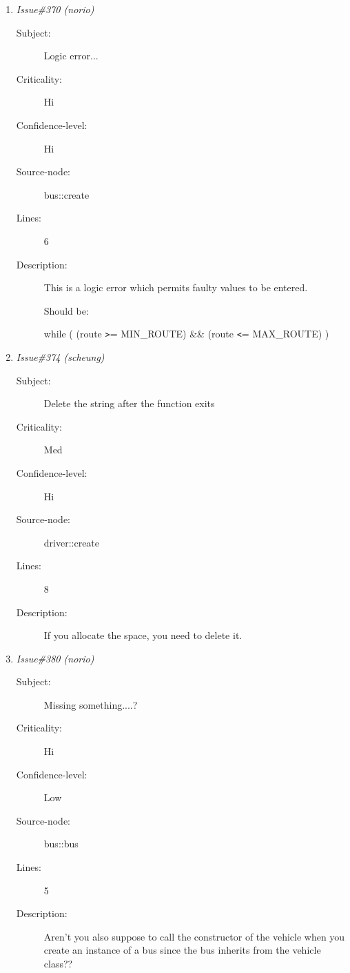 \begin{enumerate}
\begin{description}
\item [Lines:] 1

\item [Description:] Thus main should return a integer, but it does
not.
\end{description}
\item {\it Issue\#370 (norio)}
\begin{description}
\item [Subject:] Logic error...
\item [Criticality:] Hi
\item [Confidence-level:] Hi
\item [Source-node:] bus::create

\item [Lines:] 6

\item [Description:] This is a logic error which permits faulty values to be
 entered.

 Should be:

 while ( (route {\tt >}= MIN\_ROUTE) \&\& (route {\tt <}= MAX\_ROUTE) )
\end{description}
\item {\it Issue\#374 (scheung)}
\begin{description}
\item [Subject:] Delete the string after the function exits
\item [Criticality:] Med
\item [Confidence-level:] Hi
\item [Source-node:] driver::create

\item [Lines:] 8

\item [Description:] If you allocate the space, you need to delete
it.
\end{description}
\item {\it Issue\#380 (norio)}
\begin{description}
\item [Subject:] Missing something....?
\item [Criticality:] Hi
\item [Confidence-level:] Low
\item [Source-node:] bus::bus

\item [Lines:] 5

\item [Description:] Aren't you also suppose to call the constructor of the
 vehicle when you create an instance of a bus since the
 bus inherits from the vehicle class??


\end{description}
\end{enumerate}
